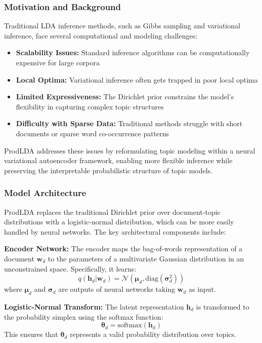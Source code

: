 \documentclass[12pt]{article}
\begin{document}
\subsubsection{Motivation and Background}
Traditional LDA inference methods, such as Gibbs sampling and variational
inference, face several computational and modeling challenges:

\begin{itemize}
    \item \textbf{Scalability Issues:} Standard inference algorithms can be computationally expensive for large corpora
    \item \textbf{Local Optima:} Variational inference often gets trapped in poor local optima
    \item \textbf{Limited Expressiveness:} The Dirichlet prior constrains the model's flexibility in capturing complex topic structures
    \item \textbf{Difficulty with Sparse Data:} Traditional methods struggle with short documents or sparse word co-occurrence patterns
\end{itemize}

ProdLDA addresses these issues by reformulating topic modeling within a neural
variational autoencoder framework, enabling more flexible inference while
preserving the interpretable probabilistic structure of topic models.

\subsubsection{Model Architecture}
ProdLDA replaces the traditional Dirichlet prior over document-topic
distributions with a logistic-normal distribution, which can be more easily
handled by neural networks. The key architectural components include:

\textbf{Encoder Network:} The encoder maps the bag-of-words representation of a document $\mathbf{w}_d$ to the parameters of a multivariate Gaussian distribution in an unconstrained space. Specifically, it learns:
\begin{equation}
    q(\mathbf{h}_d | \mathbf{w}_d) = \mathcal{N}(\boldsymbol{\mu}_d, \text{diag}(\boldsymbol{\sigma}_d^2))
\end{equation}
where $\boldsymbol{\mu}_d$ and $\boldsymbol{\sigma}_d$ are outputs of neural networks taking $\mathbf{w}_d$ as input.

\textbf{Logistic-Normal Transform:} The latent representation $\mathbf{h}_d$ is transformed to the probability simplex using the softmax function:
\begin{equation}
    \boldsymbol{\theta}_d = \text{softmax}(\mathbf{h}_d)
\end{equation}
This ensures that $\boldsymbol{\theta}_d$ represents a valid probability distribution over topics.
\end{document}
